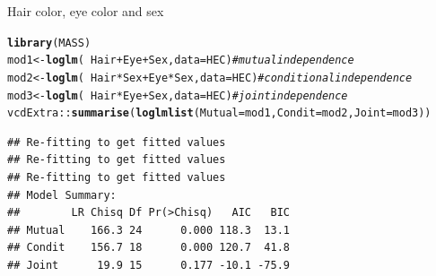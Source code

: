 \documentclass[11pt]{book}\usepackage[]{graphicx}\usepackage[]{color}
\makeatletter
\newcommand{\hlcom}[1]{\textcolor[rgb]{0.678,0.584,0.686}{\textit{#1}}}%
\newcommand{\hlopt}[1]{\textcolor[rgb]{0,0,0}{#1}}%
\newcommand{\hlstd}[1]{\textcolor[rgb]{0.345,0.345,0.345}{#1}}%
\newcommand{\hlkwb}[1]{\textcolor[rgb]{0.69,0.353,0.396}{#1}}%
\newcommand{\hlkwc}[1]{\textcolor[rgb]{0.333,0.667,0.333}{#1}}%
\newcommand{\hlkwd}[1]{\textcolor[rgb]{0.737,0.353,0.396}{\textbf{#1}}}%
\newenvironment{kframe}{%
 \def\at@end@of@kframe{}%
 \ifinner\ifhmode%
  \def\at@end@of@kframe{\end{minipage}}%
  \begin{minipage}{\columnwidth}%
 \fi\fi%
 \def\FrameCommand##1{\hskip\@totalleftmargin \hskip-\fboxsep
 \colorbox{shadecolor}{##1}\hskip-\fboxsep
     \hskip-\linewidth \hskip-\@totalleftmargin \hskip\columnwidth}%
 \MakeFramed {\advance\hsize-\width
   \@totalleftmargin\z@ \linewidth\hsize
   \@setminipage}}%
 {\par\unskip\endMakeFramed%
 \at@end@of@kframe}
\newenvironment{knitrout}{}{} %
\renewenvironment{knitrout}{\small\renewcommand{\baselinestretch}{.85}}{} %
\makeatother
\begin{document}
\begin{Example}[HEC2]{Hair color, eye color and sex}
\begin{knitrout}
\color{fgcolor}\begin{kframe}
\begin{alltt}
\hlkwd{library}\hlstd{(MASS)}
\hlstd{mod1} \hlkwb{<-} \hlkwd{loglm}\hlstd{(}\hlopt{~} \hlstd{Hair} \hlopt{+} \hlstd{Eye} \hlopt{+} \hlstd{Sex,} \hlkwc{data}\hlstd{=HEC)}     \hlcom{# mutual independence}
\hlstd{mod2} \hlkwb{<-} \hlkwd{loglm}\hlstd{(}\hlopt{~} \hlstd{Hair}\hlopt{*}\hlstd{Sex} \hlopt{+} \hlstd{Eye}\hlopt{*}\hlstd{Sex,} \hlkwc{data}\hlstd{=HEC)}   \hlcom{# conditional independence}
\hlstd{mod3} \hlkwb{<-} \hlkwd{loglm}\hlstd{(}\hlopt{~} \hlstd{Hair}\hlopt{*}\hlstd{Eye} \hlopt{+} \hlstd{Sex,} \hlkwc{data}\hlstd{=HEC)}       \hlcom{# joint independence}
\hlstd{vcdExtra::}\hlkwd{summarise}\hlstd{(}\hlkwd{loglmlist}\hlstd{(}\hlkwc{Mutual}\hlstd{=mod1,} \hlkwc{Condit}\hlstd{=mod2,} \hlkwc{Joint}\hlstd{=mod3))}
\end{alltt}
\begin{verbatim}
## Re-fitting to get fitted values
## Re-fitting to get fitted values
## Re-fitting to get fitted values
## Model Summary:
##        LR Chisq Df Pr(>Chisq)   AIC   BIC
## Mutual    166.3 24      0.000 118.3  13.1
## Condit    156.7 18      0.000 120.7  41.8
## Joint      19.9 15      0.177 -10.1 -75.9
\end{verbatim}
\end{kframe}
\end{knitrout}


\end{Example}
\end{document}
